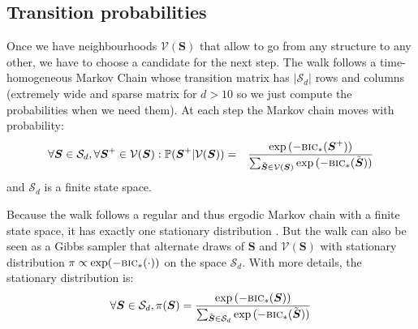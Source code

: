 \documentclass[12pt,a4paper]{report}
\begin{document}
	\subsection{Transition probabilities}
		Once we have neighbourhoods $\mathcal{V}(\boldsymbol{S})$ that allow to go from any structure to any other, we have to choose a candidate for the next step.
The walk follows a time-homogeneous Markov Chain whose transition matrix %
has $|\mathcal{S}_d|$ rows and columns (extremely wide  and sparse matrix for $d>10$ so we just compute the probabilities when we need them).
	At each step the Markov chain moves with probability:
	\begin{eqnarray}
			\forall \boldsymbol{S} \in \mathcal{S}_d, \forall \boldsymbol{S}^+\in \mathcal{V}(\boldsymbol{S}): %
			\mathbb{P}(\boldsymbol{S}^+|\mathcal{V}(\boldsymbol{S}))&=&\frac{\exp{(-\mbox{{\sc bic}}_*(\boldsymbol{S}^+))}}{\sum_{\tilde{\boldsymbol{S}}\in \mathcal{V}(\boldsymbol{S})}\exp{(-\mbox{{\sc bic}}_*(\tilde{\boldsymbol{S}}))}} \label{transitionproba}
	\end{eqnarray}
	and $\mathcal{S}_d$ is a finite state space.%
	 
Because the walk follows a regular and thus ergodic Markov chain with a finite state space, it has exactly one stationary distribution \cite{grinstead1997introduction}. %
%	
%	
%	
But the walk can also be seen as a Gibbs sampler \cite{casella1992explaining} that alternate draws of $\boldsymbol{S}$ and  $\mathcal{V}(\boldsymbol{S})$ with stationary distribution $\pi \propto \operatorname{exp}(-\mbox{{\sc bic}}_*(\cdot))$ on the space $\mathcal{S}_d$. With more details, the stationary distribution is:
\begin{equation}
	\forall \boldsymbol{S} \in \mathcal{S}_d, \pi(\boldsymbol{S})=\frac{\exp{(-\mbox{{\sc bic}}_*(\boldsymbol{S}))}}{\sum_{\tilde{\boldsymbol{S}}\in \mathcal{S}_d}\exp{(-\mbox{{\sc bic}}_*(\tilde{\boldsymbol{S}}))}} \nonumber
\end{equation}
	
\end{document}
